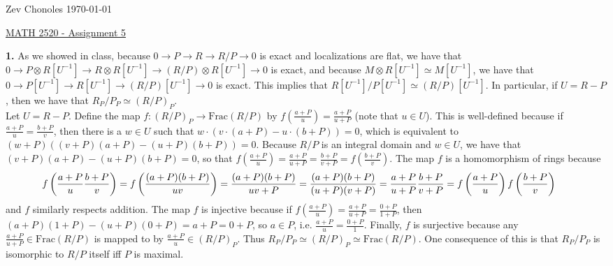 \documentclass[11pt]{article}
\newcommand{\num}[1]{\noindent \textbf{#1}}
\theoremstyle{definition}
\begin{document}
\noindent Zev Chonoles \hfill \today\\[-0.4in]
\begin{center}
\noindent \underline{MATH 2520 - Assignment 5}
\end{center}

\num{1.} As we showed in class, because $0\rightarrow P\rightarrow R\rightarrow R/P\rightarrow0$ is exact and localizations are flat, we have that $0\rightarrow P\otimes R[U^{-1}]\rightarrow R\otimes R[U^{-1}]\rightarrow (R/P)\otimes R[U^{-1}]\rightarrow0$ is exact, and because $M\otimes R[U^{-1}]\simeq M[U^{-1}]$, we have that $0\rightarrow P[U^{-1}]\rightarrow R[U^{-1}]\rightarrow (R/P)[U^{-1}]\rightarrow0$ is exact. This implies that $R[U^{-1}]/P[U^{-1}]\simeq (R/P)[U^{-1}]$. In particular, if $U=R-P$, then we have that $R_P/P_P\simeq (R/P)_P$.\\

\noindent Let $U=R-P$. Define the map $f:(R/P)_P\rightarrow\text{Frac}(R/P)$ by $f(\frac{a+P}{u})=\frac{a+P}{u+P}$ (note that $u\in U$). This is well-defined because if $\frac{a+P}{u}=\frac{b+P}{v}$, then there is a $w\in U$ such that $w\cdot(v\cdot(a+P)-u\cdot(b+P))=0$, which is equivalent to $(w+P)((v+P)(a+P)-(u+P)(b+P))=0$. Because $R/P$ is an integral domain and $w\in U$, we have that $(v+P)(a+P)-(u+P)(b+P)=0$, so that $f(\frac{a+P}{u})=\frac{a+P}{u+P}=\frac{b+P}{v+P}=f(\frac{b+P}{v})$. The map $f$ is a homomorphism of rings because 
\small
\[\hskip-0.2in f\left(\frac{a+P}{u}\frac{b+P}{v}\right)=f\left(\frac{(a+P)(b+P)}{uv}\right)=\frac{(a+P)(b+P)}{uv+P}=\frac{(a+P)(b+P)}{(u+P)(v+P)}=\frac{a+P}{u+P}\frac{b+P}{v+P}=f\left(\frac{a+P}{u}\right)f\left(\frac{b+P}{v}\right)\]
\normalsize
and $f$ similarly respects addition. The map $f$ is injective because if $f(\frac{a+P}{u})=\frac{a+P}{u+P}=\frac{0+P}{1+P}$, then $(a+P)(1+P)-(u+P)(0+P)=a+P=0+P$, so $a\in P$, i.e. $\frac{a+P}{u}=\frac{0+P}{1}$. Finally, $f$ is surjective because any $\frac{a+P}{u+P}\in\text{Frac}(R/P)$ is mapped to by $\frac{a+P}{u}\in (R/P)_P$. Thus $R_P/P_P\simeq (R/P)_P\simeq\text{Frac}(R/P)$. One consequence of this is that $R_P/P_P$ is isomorphic to $R/P$ itself iff $P$ is maximal. \\

\end{document}
